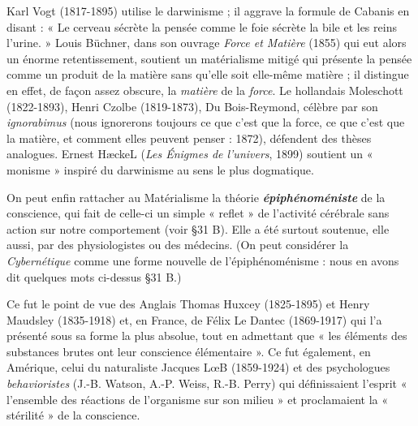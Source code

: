 \vspace{0.24cm}
{\footnotesize Karl Vogt (1817-1895) utilise le darwinisme ; il aggrave la formule de
Cabanis en disant : « Le cerveau sécrète la pensée comme le foie sécrète la
bile et les reins l'urine. » Louis Büchner, dans son ouvrage {\it Force et Matière}
(1855) qui eut alors un énorme retentissement, soutient un matérialisme
mitigé qui présente la pensée comme un produit de la matière sans qu'elle
soit elle-même matière ; il distingue en effet, de façon assez obscure, la
{\it matière} de la {\it force}. Le hollandais Moleschott (1822-1893), Henri Czolbe
(1819-1873), Du Bois-Reymond, célèbre par son {\it ignorabimus} (nous ignorerons
toujours ce que c’est que la force, ce que c'est que la matière, et
comment elles peuvent penser : 1872), défendent des thèses analogues.
Ernest HæckeL ({\it Les Énigmes de l'univers}, 1899) soutient un « monisme »
inspiré du darwinisme au sens le plus dogmatique.}
\vspace{0.31cm}


On peut enfin rattacher au Matérialisme la théorie \textbf{\textit {épiphénoméniste}}
de la conscience, qui fait de celle-ci un simple « reflet » de l’activité
cérébrale sans action sur notre comportement (voir \S 31 B). Elle a été
surtout soutenue, elle aussi, par des physiologistes ou des médecins.
{\scriptsize (On peut considérer la {\it Cybernétique} comme une forme nouvelle de
l'épiphénoménisme : nous en avons dit quelques mots ci-dessus \S 31 B.)}

\vspace{0.24cm}
{\footnotesize Ce fut le point de vue des Anglais Thomas Huxcey (1825-1895) et Henry
Maudsley (1835-1918) et, en France, de Félix Le Dantec (1869-1917)
qui l’a présenté sous sa forme la plus absolue, tout en admettant que « les
éléments des substances brutes ont leur conscience élémentaire ». Ce fut
également, en Amérique, celui du naturaliste Jacques LœB (1859-1924) et
des psychologues {\it behavioristes} (J.-B. Watson, A.-P. Weiss, R.-B. Perry)
qui définissaient l'esprit « l’ensemble des réactions de l'organisme sur son
milieu » et proclamaient la « stérilité » de la conscience.}
\vspace{0.31cm}


